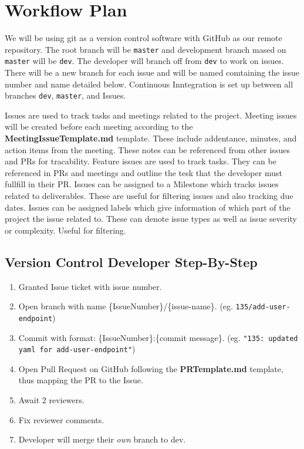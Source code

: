 \documentclass{article}
\def\code#1{\texttt{#1}}
\begin{document}
\section{Workflow Plan}

We will be using git as a version control software with GitHub as our remote repository. The root branch will be \code{master} and development branch mased on \code{master} will be \code{dev}. The developer will branch off from \code{dev} to work on issues. There will be a new branch for each issue and will be named comtaining the issue number and name detailed below. Continuous Inntegration is set up between all branches \code{dev}, \code{master}, and Issues.

Issues are used to track tasks and meetings related to the project. Meeting issues will be created before each meeting according to the \textbf{MeetingIssueTemplate.md} template. These include addentance, minutes, and action items from the meeting. These notes can be referenced from other issues and PRs for tracability. 
Feature issues are used to track tasks. They can be referenced in PRs and meetings and outline the tesk that the developer must fullfill in their PR. 
Issues can be assigned to a Milestone which tracks issues related to deliverables. These are useful for filtering issues and also tracking due dates.
Issues can be assigned labels which give information of which part of the project the issue related to. These can denote issue types as well as issue severity or complexity. Useful for filtering.

\subsection{Version Control Developer Step-By-Step}

\begin{enumerate}
	\item Granted Issue ticket with issue number.
	\item Open branch with name \{IssueNumber\}/\{issue-name\}. (eg. \code{135/add-user-endpoint})
	\item Commit with format: \{IssueNumber\}:\{commit message\}. (eg. \code{"135: updated yaml for add-user-endpoint"})
	\item Open Pull Request on GitHub following the \textbf{PRTemplate.md} template, thus mapping the PR to the Issue.
	\item Await 2 reviewers.
	\item Fix reviewer comments.
	\item Developer will merge their \emph{own} branch to dev.
\end{enumerate}
\end{document}
